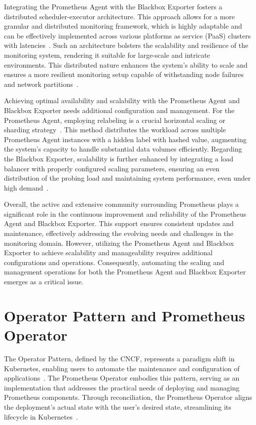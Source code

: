 Integrating the Prometheus Agent with the Blackbox Exporter fosters a distributed scheduler-executor architecture. This approach allows for a more granular and distributed monitoring framework, which is highly adaptable and can be effectively implemented across various platforms as service (PaaS) clusters with latencies~\parencite{prometheusUnderstandingUsingMultitarget}. Such an architecture bolsters the scalability and resilience of the monitoring system, rendering it suitable for large-scale and intricate environments. This distributed nature enhances the system's ability to scale and ensures a more resilient monitoring setup capable of withstanding node failures and network partitions~\parencite{prometheusIntroducingPrometheusAgent}.

Achieving optimal availability and scalability with the Prometheus Agent and Blackbox Exporter needs additional configuration and management. For the Prometheus Agent, employing relabeling is a crucial horizontal scaling or sharding strategy~\parencite{prometheusHowRelabelingPrometheus}. This method distributes the workload across multiple Prometheus Agent instances with a hidden label with hashed value, augmenting the system's capacity to handle substantial data volumes efficiently. Regarding the Blackbox Exporter, scalability is further enhanced by integrating a load balancer with properly configured scaling parameters, ensuring an even distribution of the probing load and maintaining system performance, even under high demand~\parencite{prometheusIntroducingPrometheusAgent}.

Overall, the active and extensive community surrounding Prometheus plays a significant role in the continuous improvement and reliability of the Prometheus Agent and Blackbox Exporter. This support ensures consistent updates and maintenance, effectively addressing the evolving needs and challenges in the monitoring domain. However, utilizing the Prometheus Agent and Blackbox Exporter to achieve scalability and manageability requires additional configurations and operations. Consequently, automating the scaling and management operations for both the Prometheus Agent and Blackbox Exporter emerges as a critical issue.

\section{Operator Pattern and Prometheus Operator}

The Operator Pattern, defined by the \ac{CNCF}, represents a paradigm shift in Kubernetes, enabling users to automate the maintenance and configuration of applications~\parencite{kubernetesOperatorPattern}. The Prometheus Operator embodies this pattern, serving as an implementation that addresses the practical needs of deploying and managing Prometheus components. Through reconciliation, the Prometheus Operator aligns the deployment's actual state with the user's desired state, streamlining its lifecycle in Kubernetes~\parencite{prometheusoperatorIntroduction2020}.


